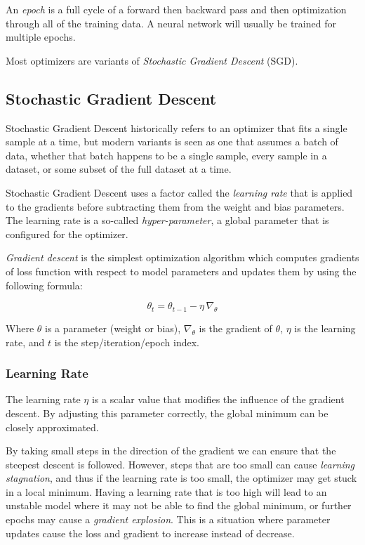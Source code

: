 \documentclass[a4paper]{report}
\begin{document}
An \emph{epoch} is a full cycle of a forward then backward pass and then optimization through all of the training data. A neural network will usually be trained for multiple epochs.

Most optimizers are variants of \emph{Stochastic Gradient Descent} (SGD).

\subsection*{Stochastic Gradient Descent}
Stochastic Gradient Descent historically refers to an optimizer that fits a single sample at a time, but modern variants is seen as one that assumes a batch of data, whether that batch happens to be a single sample, every sample in a dataset, or some subset of the full dataset at a time.

Stochastic Gradient Descent uses a factor called the \emph{learning rate} that is applied to the gradients before subtracting them from the weight and bias parameters. The learning rate is a so-called \emph{hyper-parameter}, a global parameter that is configured for the optimizer.

\emph{Gradient descent} is the simplest optimization algorithm which computes gradients of loss function with respect to model parameters and updates them by using the following formula:

\begin{equation*}
    \theta_t = \theta_{t-1} - \eta \, \nabla_\theta
\end{equation*}

Where $\theta$ is a parameter (weight or bias), $\nabla_\theta$ is the gradient of $\theta$, $\eta$ is the learning rate, and $t$ is the step/iteration/epoch index. 

\subsubsection*{Learning Rate}
The learning rate $\eta$ is a scalar value that modifies the influence of the gradient descent. By adjusting this parameter correctly, the global minimum can be closely approximated. 

By taking small steps in the direction of the gradient we can ensure that the steepest descent is followed. However, steps that are too small can cause \emph{learning stagnation}, and thus if the learning rate is too small, the optimizer may get stuck in a local minimum. Having a learning rate that is too high will lead to an unstable model where it may not be able to find the global minimum, or further epochs may cause a \emph{gradient explosion}. This is a situation where parameter updates cause the loss and gradient to increase instead of decrease.
\end{document}
